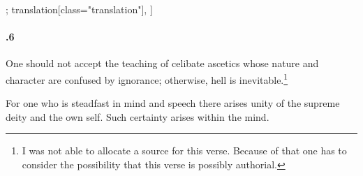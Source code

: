 \begin{alignment}[
  texts=edition[class="edition"];
  translation[class="translation"],
  ]
\begin{translation}
\begin{tlate}[57_6]
\paragraph{.6} One should not accept the teaching of celibate ascetics whose nature and character are confused by ignorance; otherwise, hell is inevitable.\footnote{I was not able to allocate a source for this verse. Because of that one has to consider the possibility that this verse is possibly authorial.}\\
\end{tlate}
\begin{tlate}[p57_03]
For one who is steadfast in mind and speech there arises unity of the supreme deity and the own self. Such certainty arises within the mind.  
\flushpage
    \end{tlate}
  \end{translation}
\end{alignment}
\pagebreak %

